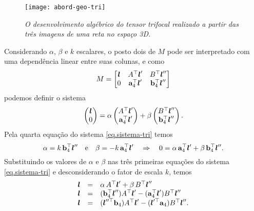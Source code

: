 \begin{figure}[!htb]
\centering
\texttt{[image: abord-geo-tri]}
\caption{{\it O desenvolvimento algébrico do tensor trifocal realizado a partir das três imagens de uma reta no espaço 3D.}}
\label{fig.abord-geo-tri}
\end{figure}
Considerando $\alpha$, $\beta$ e $k$ escalares, o posto dois de $M$ pode ser interpretado com uma dependência linear entre suas colunas, e como
\begin{equation*}
M=
\begin{bmatrix}
\boldsymbol{l}&A^\top\boldsymbol{l}'&B^\top\boldsymbol{l}''\\
0&{\bf a}^\top_4\boldsymbol{l}'&
{\bf b}^\top_4\boldsymbol{l}''
\end{bmatrix}
\end{equation*}
podemos definir o sistema
\begin{equation}\label{eq.sistema-tri}
\begin{pmatrix}
\boldsymbol{l}\\
0
\end{pmatrix}
=
\alpha
\begin{pmatrix}
A^\top\boldsymbol{l}'\\
{\bf a}^\top_4\boldsymbol{l}'
\end{pmatrix}
+\beta
\begin{pmatrix}
B^\top\boldsymbol{l}''\\
{\bf b}^\top_4\boldsymbol{l}''
\end{pmatrix}.
\end{equation}
Pela quarta equação do sistema \ref{eq.sistema-tri} temos
\begin{equation*}
\alpha=k\,{\bf b}^\top_4\boldsymbol{l}''\quad\text{e}\quad\beta=-k\,{\bf a}^\top_4\boldsymbol{l}'\quad\Rightarrow\quad0=\alpha\,{\bf a}^\top_4\boldsymbol{l}'+\beta\,{\bf b}^\top_4\boldsymbol{l}''.
\end{equation*}
Substituindo os valores de $\alpha$ e $\beta$ nas três primeiras equações do sistema \ref{eq.sistema-tri} e desconsiderando o fator de escala $k$, temos
\begin{equation*}
\begin{array}{rcl}
\boldsymbol{l}&=&\alpha\,A^\top\boldsymbol{l}'+\beta\,B^\top\boldsymbol{l}''\\
\boldsymbol{l}&=&({\bf b}^\top_4\boldsymbol{l}'')A^\top\boldsymbol{l}'-({\bf a}^\top_4\boldsymbol{l}')B^\top\boldsymbol{l}''\\
\boldsymbol{l}&=&(\boldsymbol{l}''^\top{\bf b}_4)A^\top\boldsymbol{l}'-(\boldsymbol{l}'^\top{\bf a}_4)B^\top\boldsymbol{l}''.
\end{array}
\end{equation*}
